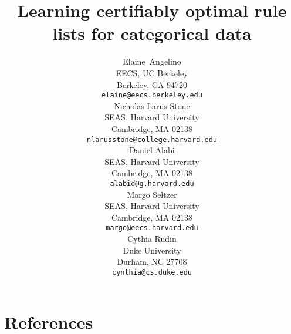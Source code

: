 \documentclass{article}
\title{Learning certifiably optimal rule lists for categorical data}
\author{
  Elaine~Angelino\\
  EECS, UC Berkeley\\
  Berkeley, CA 94720\\
  \texttt{elaine@eecs.berkeley.edu}\\
  \AND
  Nicholas Larus-Stone\\
  SEAS, Harvard University\\
  Cambridge, MA 02138\\
  \texttt{nlarusstone@college.harvard.edu}\\
  \AND
  Daniel Alabi\\
  SEAS, Harvard University\\
  Cambridge, MA 02138\\
  \texttt{alabid@g.harvard.edu}\\
  \AND
  Margo Seltzer\\
  SEAS, Harvard University\\
  Cambridge, MA 02138\\
  \texttt{margo@eecs.harvard.edu} \\
  Cythia Rudin\\
  Duke University\\
  Durham, NC 27708\\
  \texttt{cynthia@cs.duke.edu} \\
}
\begin{document}

\maketitle

\begin{abstract}

\end{abstract}















\section*{References}
\medskip

\small


\end{document}

